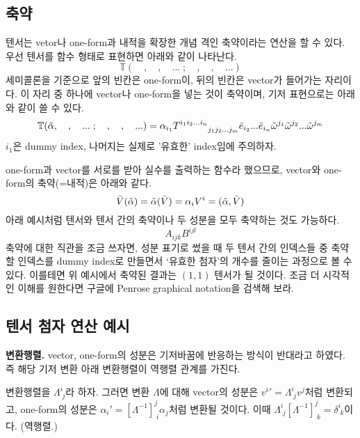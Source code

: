 \subsection{축약}
텐서는 vetor나 one-form과 내적을 확장한 개념 격인 축약이라는 연산을 할 수 있다. 우선 텐서를 함수 형태로 표현하면 아래와 같이 나타난다.
\begin{equation}
    \mathbb{T}(\quad,\quad,\quad ...\; ; \quad, \quad,\quad ...)
\end{equation}
세미콜론을 기준으로 앞의 빈칸은 one-form이, 뒤의 빈칸은 vector가 들어가는 자리이다. 이 자리 중 하나에 vector나 one-form을 넣는 것이 축약이며, 기저 표현으로는 아래와 같이 쓸 수 있다.
\begin{equation}
    \mathbb{T}(\Tilde{\alpha},\quad,\quad ...\; ; \quad, \quad,\quad ...)=\alpha_{i_1} T^{i_1 i_2 ... i_n}_{\qquad\quad j_1 j_2 ... j_m}\Bar{e}_{i_2}...\Bar{e}_{i_n}\Tilde{\omega}^{j_1}\Tilde{\omega}^{j_2}...\Tilde{\omega}^{j_m}
\end{equation}
$i_1$은 dummy index, 나머지는 실제로 '유효한' index임에 주의하자.

one-form과 vector를 서로를 받아 실수를 출력하는 함수라 했으므로, vector와 one-form의 축약(=내적)은 아래와 같다.
\begin{equation}
    \Bar{V}(\Tilde{\alpha})=\Tilde{\alpha}(\Bar{V})=\alpha_i V^i=(\Tilde{\alpha},\Bar{V})
\end{equation}
아래 예시처럼 텐서와 텐서 간의 축약이나 두 성분을 모두 축약하는 것도 가능하다.
\begin{equation}
    A_{ijk} B^{ijl}
\end{equation}
축약에 대한 직관을 조금 쓰자면, 성분 표기로 썼을 때 두 텐서 간의 인덱스들 중 축약할 인덱스를 dummy index로 만들면서 `유효한 첨자'의 개수를 줄이는 과정으로 볼 수 있다. 이를테면 위 예시에서 축약된 결과는 $(1,1)$ 텐서가 될 것이다. 조금 더 시각적인 이해를 원한다면 구글에 Penrose graphical notation을 검색해 보라.
\subsection{텐서 첨자 연산 예시}
\textbf{변환행렬.}
vector, one-form의 성분은 기저바꿈에 반응하는 방식이 반대라고 하였다. 즉 해당 기저 변환 아래 변환행렬이 역행렬 관계를 가진다.

변환행렬을 $\Lambda^i_{\; j}$라 하자. 그러면 변환 $\Lambda$에 대해 vector의 성분은 ${v^i}'=\Lambda^i_{\; j} v^j$처럼 변환되고, one-form의 성분은 $\alpha_i'={[\Lambda^{-1}]}^j_{\;i} \alpha_j$처럼 변환될 것이다. 이때 $\Lambda^i_{\;j}[\Lambda^{-1}]^j_{\;k}=\delta^i_{\;k}$이다. (역행렬.)


